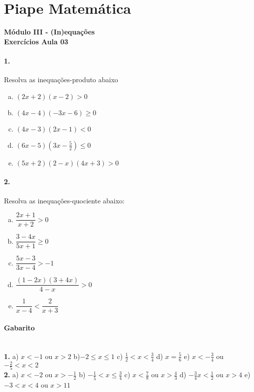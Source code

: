 \documentclass[a4paper,12pt]{article}
\begin{document}
 
  
\section*{Piape Matemática} 
\textbf{Módulo III - (In)equações}\\
\textbf{Exercícios Aula 03}         
\begin{multicols}{2}
\paragraph*{1.} Resolva as inequações-produto abaixo
\begin{enumerate}[a)]   
    \item $(2x+2)(x-2) > 0$
    \item $(4x-4)(-3x-6) \ge 0$
    \item $(4x-3)(2x-1) < 0 $
    \item $(6x-5)(3x-\frac{5}{2}) \le 0$
    \item $(5x + 2)(2 - x)(4x + 3) > 0$
\end{enumerate}

\vspace*{2cm}

\paragraph*{2.} Resolva as inequações-quociente abaixo:

\begin{enumerate}[a)]
    \item $\dfrac{2x+1}{x+2} > 0$
    \item $\dfrac{3 - 4x}{5x+1} \ge 0$
    \item $\dfrac{5x - 3}{3x - 4} > -1$
    \item $\dfrac{(1-2x)(3+4x)}{4-x} > 0$
    \item $\dfrac{1}{x-4} < \dfrac{2}{x+3}$
\end{enumerate}

\end{multicols}
 
\vspace*{\fill}
{\footnotesize
\paragraph*{Gabarito} \hspace*{\fill}\\
\textbf{1.}
 a) $x < -1$ ou $x > 2$
 b)$-2 \le x \le 1$
 c) $\frac{1}{2} < x < \frac{3}{4}$
 d) $ x= \frac{5}{6}$
 e) $x < -\frac{3}{4}$ ou $-\frac{2}{5} < x < 2$\\
\textbf{2.}
    a) $x < -2$ ou $x > -\frac{1}{2}$
    b) $-\frac{1}{5} < x \le \frac{3}{4}$
    c) $x < \frac{7}{8}$ ou $x > \frac{4}{3}$
    d) $ -\frac{3}{4} x < \frac{1}{2}$ ou $x > 4$
    e) $-3 < x < 4$ ou $x>11$ 
}
\end{document}
